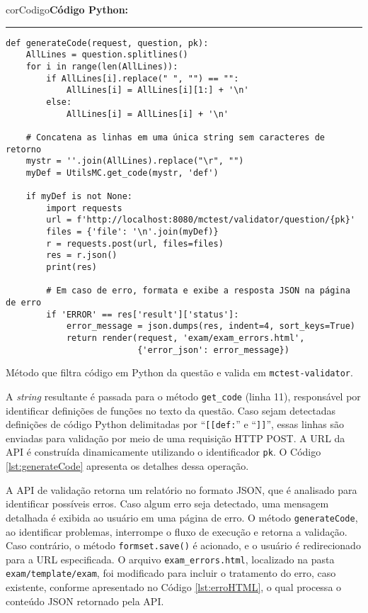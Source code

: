 \begin{listing}[!ht]
    \begin{myboxCode}{corCodigo}{\textbf{Código Python: }}\vspace{3mm}
    \hrule
    \begin{verbatim}
def generateCode(request, question, pk):
    AllLines = question.splitlines()
    for i in range(len(AllLines)):
        if AllLines[i].replace(" ", "") == "":
            AllLines[i] = AllLines[i][1:] + '\n'
        else:
            AllLines[i] = AllLines[i] + '\n'

    # Concatena as linhas em uma única string sem caracteres de retorno
    mystr = ''.join(AllLines).replace("\r", "")
    myDef = UtilsMC.get_code(mystr, 'def')

    if myDef is not None:
        import requests
        url = f'http://localhost:8080/mctest/validator/question/{pk}'
        files = {'file': '\n'.join(myDef)}
        r = requests.post(url, files=files)
        res = r.json()
        print(res)

        # Em caso de erro, formata e exibe a resposta JSON na página de erro
        if 'ERROR' == res['result']['status']:
            error_message = json.dumps(res, indent=4, sort_keys=True)
            return render(request, 'exam/exam_errors.html', 
                          {'error_json': error_message})
\end{verbatim}
\end{myboxCode}
\caption{Método que filtra código em Python da questão e valida em \texttt{mctest-validator}.}
\label{lst:generateCode}
\end{listing}


A \textit{string} resultante é passada para o método \texttt{get\_code} (linha 11), responsável por identificar definições de funções no texto da questão. Caso sejam detectadas definições de código Python delimitadas por ``\texttt{[[def:}'' e ``\texttt{]]}'', essas linhas são enviadas para validação por meio de uma requisição HTTP POST. A URL da API é construída dinamicamente utilizando o identificador \texttt{pk}. O Código \ref{lst:generateCode} apresenta os detalhes dessa operação.

A API de validação retorna um relatório no formato JSON, que é analisado para identificar possíveis erros. Caso algum erro seja detectado, uma mensagem detalhada é exibida ao usuário em uma página de erro. O método \texttt{generateCode}, ao identificar problemas, interrompe o fluxo de execução e retorna a validação. Caso contrário, o método \texttt{formset.save()} é acionado, e o usuário é redirecionado para a URL especificada. O arquivo \texttt{exam\_errors.html}, localizado na pasta \texttt{exam/template/exam}, foi modificado para incluir o tratamento do erro, caso existente, conforme apresentado no Código \ref{lst:erroHTML}, o qual processa o conteúdo JSON retornado pela API.

